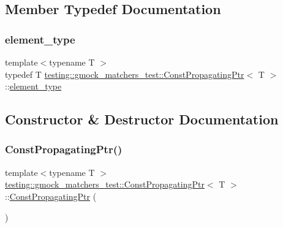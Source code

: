 \subsection{Member Typedef Documentation}
\mbox{\label{classtesting_1_1gmock__matchers__test_1_1ConstPropagatingPtr_a2ad1f3127185fadd33eed42627ed5644}} 
\subsubsection{\texorpdfstring{element\_type}{element\_type}}
{\footnotesize\ttfamily template$<$typename T $>$ \\
typedef T \mbox{\hyperlink{classtesting_1_1gmock__matchers__test_1_1ConstPropagatingPtr}{testing\+::gmock\+\_\+matchers\+\_\+test\+::\+Const\+Propagating\+Ptr}}$<$ T $>$\+::\mbox{\hyperlink{classtesting_1_1gmock__matchers__test_1_1ConstPropagatingPtr_a2ad1f3127185fadd33eed42627ed5644}{element\+\_\+type}}}



\subsection{Constructor \& Destructor Documentation}
\mbox{\label{classtesting_1_1gmock__matchers__test_1_1ConstPropagatingPtr_abdda67deda67ed234da2231fd86f05ed}} 
\subsubsection{\texorpdfstring{ConstPropagatingPtr()}{ConstPropagatingPtr()}\hspace{0.1cm}{\footnotesize\ttfamily [1/3]}}
{\footnotesize\ttfamily template$<$typename T $>$ \\
\mbox{\hyperlink{classtesting_1_1gmock__matchers__test_1_1ConstPropagatingPtr}{testing\+::gmock\+\_\+matchers\+\_\+test\+::\+Const\+Propagating\+Ptr}}$<$ T $>$\+::\mbox{\hyperlink{classtesting_1_1gmock__matchers__test_1_1ConstPropagatingPtr}{Const\+Propagating\+Ptr}} (\begin{DoxyParamCaption}{ }\end{DoxyParamCaption})\hspace{0.3cm}{\ttfamily [inline]}}

